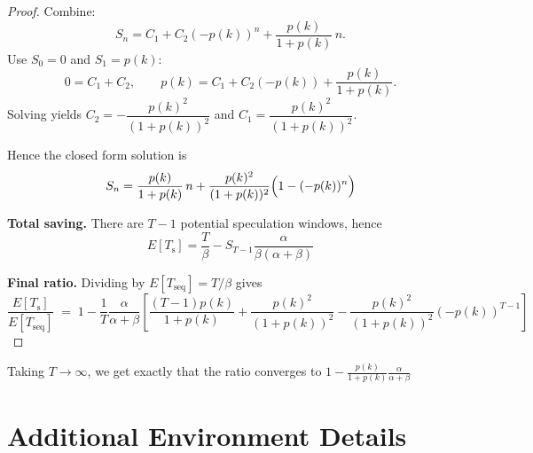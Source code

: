 \begin{proof}
Combine:
\[
S_n = C_1 + C_2(-p(k))^n + \frac{p(k)}{1+p(k)}\,n.
\]
Use $S_0=0$ and $S_1=p(k)$:
\[
0=C_1+C_2,\qquad
p(k)=C_1 + C_2(-p(k)) + \frac{p(k)}{1+p(k)}.
\]
Solving yields $C_2=-\dfrac{p(k)^2}{(1+p(k))^2}$ and $C_1=\dfrac{p(k)^2}{(1+p(k))^2}$.

Hence the closed form solution is
\[
S_n=\frac{p(k)}{1+p(k)}\,n+\frac{p(k)^2}{(1+p(k))^2}\Bigl(1-(-p(k))^n\Bigr)
\]

\medskip
\textbf{Total saving.}  
There are $T-1$ potential speculation windows, hence
\[
E[T_{\mathrm{s}}]
= \frac{T}{\beta} - S_{T-1}\frac{\alpha}{\beta(\alpha+\beta)}
\]

\medskip
\textbf{Final ratio.}  
Dividing by $E[T_{\mathrm{seq}}] = T/\beta$ gives
\[
    \frac{E[T_{\mathrm{s}}]}{E[T_{\mathrm{seq}}]}
    \;=\;
    1 - \frac{1}{T}\frac{\alpha}{\alpha+\beta}\left[\frac{(T-1)p(k)}{1+p(k)}+\frac{p(k)^2}{(1+p(k))^2} - \frac{p(k)^2}{(1+p(k))^2}(-p(k))^{T-1}\right]
\]
\end{proof}
Taking $T\to\infty$, we get exactly that the ratio converges to $1-\frac{p(k)}{1+p(k)}\frac{\alpha}{\alpha+\beta}$



\newpage
\section{Additional Environment Details}
\label{app:additional_details}



